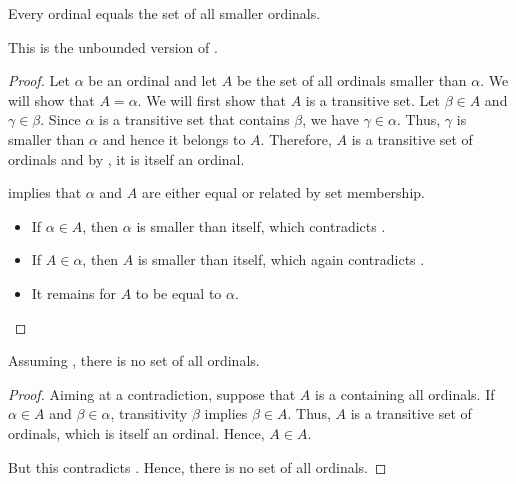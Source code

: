 \begin{proposition}\label{thm:ordinal_is_set_of_smaller_ordinals}
  Every ordinal equals the set of all smaller ordinals.

  This is the unbounded version of .
\end{proposition}
\begin{proof}
  Let \( \alpha \) be an ordinal and let \( A \) be the set of all ordinals smaller than \( \alpha \). We will show that \( A = \alpha \). We will first show that \( A \) is a transitive set. Let \( \beta \in A \) and \( \gamma \in \beta \). Since \( \alpha \) is a transitive set that contains \( \beta \), we have \( \gamma \in \alpha \). Thus, \( \gamma \) is smaller than \( \alpha \) and hence it belongs to \( A \). Therefore, \( A \) is a transitive set of ordinals and by , it is itself an ordinal.

   implies that \( \alpha \) and \( A \) are either equal or related by set membership.
  \begin{itemize}
    \item If \( \alpha \in A \), then \( \alpha \) is smaller than itself, which contradicts .

    \item If \( A \in \alpha \), then \( A \) is smaller than itself, which again contradicts .

    \item It remains for \( A \) to be equal to \( \alpha \).
  \end{itemize}
\end{proof}

\begin{theorem}\label{thm:burali_forti_paradox}
  Assuming , there is no set of all ordinals.
\end{theorem}
\begin{proof}
  Aiming at a contradiction, suppose that \( A \) is a containing all ordinals. If \( \alpha \in A \) and \( \beta \in \alpha \), transitivity \( \beta \) implies \( \beta \in A \). Thus, \( A \) is a transitive set of ordinals, which  is itself an ordinal. Hence, \( A \in A \).

  But this contradicts . Hence, there is no set of all ordinals.
\end{proof}


